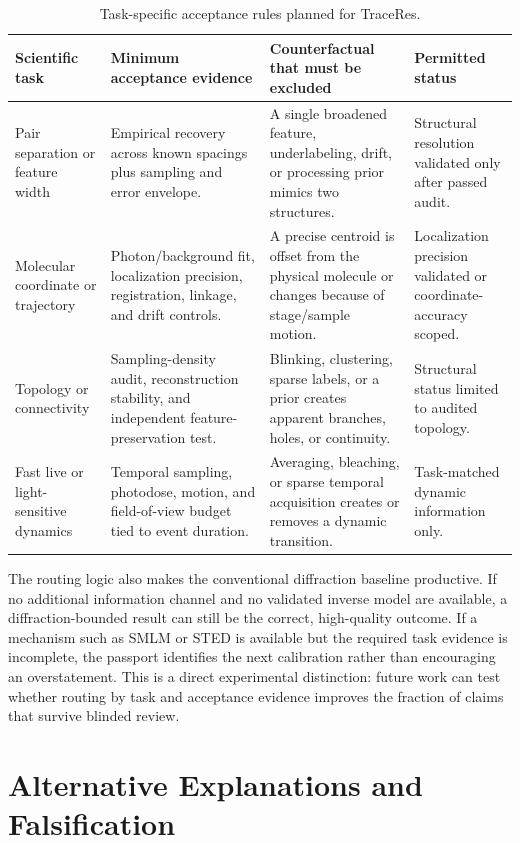 \documentclass[conference]{IEEEtran}
\begin{document}
\begin{table}[t]
\caption{Task-specific acceptance rules planned for TraceRes.}
\label{tab:routing}
\centering
\footnotesize
\setlength{\tabcolsep}{3pt}
\begin{tabular}{p{} p{} p{} p{}}
\hline
\textbf{Scientific task} & \textbf{Minimum acceptance evidence} & \textbf{Counterfactual that must be excluded} & \textbf{Permitted status}\\
\hline
Pair separation or feature width & Empirical recovery across known spacings plus sampling and error envelope. & A single broadened feature, underlabeling, drift, or processing prior mimics two structures. & Structural resolution validated only after passed audit.\\
Molecular coordinate or trajectory & Photon/background fit, localization precision, registration, linkage, and drift controls. & A precise centroid is offset from the physical molecule or changes because of stage/sample motion. & Localization precision validated or coordinate-accuracy scoped.\\
Topology or connectivity & Sampling-density audit, reconstruction stability, and independent feature-preservation test. & Blinking, clustering, sparse labels, or a prior creates apparent branches, holes, or continuity. & Structural status limited to audited topology.\\
Fast live or light-sensitive dynamics & Temporal sampling, photodose, motion, and field-of-view budget tied to event duration. & Averaging, bleaching, or sparse temporal acquisition creates or removes a dynamic transition. & Task-matched dynamic information only.\\
\hline
\end{tabular}
\end{table}

The routing logic also makes the conventional diffraction baseline productive. If no additional information channel and no validated inverse model are available, a diffraction-bounded result can still be the correct, high-quality outcome. If a mechanism such as SMLM or STED is available but the required task evidence is incomplete, the passport identifies the next calibration rather than encouraging an overstatement. This is a direct experimental distinction: future work can test whether routing by task and acceptance evidence improves the fraction of claims that survive blinded review.

\section{Alternative Explanations and Falsification}
\end{document}
